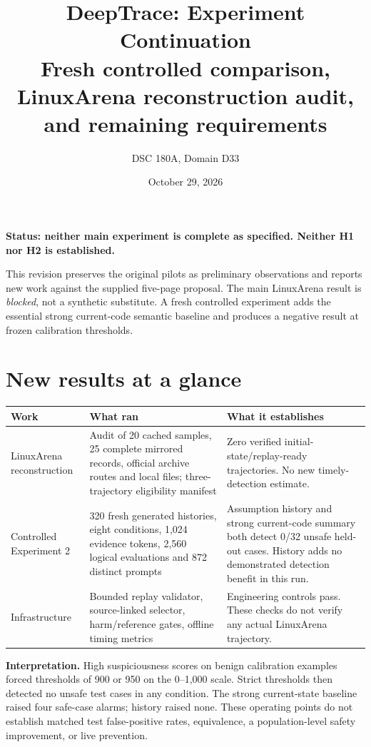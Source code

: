 \documentclass[10pt,letterpaper]{article}
\title{DeepTrace: Experiment Continuation\\\large Fresh controlled comparison, LinuxArena reconstruction audit, and remaining requirements}
\author{DSC 180A, Domain D33}\date{October 29, 2026}
\begin{document}
\maketitle
\textbf{Status: neither main experiment is complete as specified. Neither H1 nor H2 is established.}

This revision preserves the original pilots as preliminary observations and reports new work against the supplied five-page proposal. The main LinuxArena result is \emph{blocked}, not a synthetic substitute. A fresh controlled experiment adds the essential strong current-code semantic baseline and produces a negative result at frozen calibration thresholds.

\section*{New results at a glance}
\begin{tabularx}{\linewidth}{@{}>{\raggedright\arraybackslash}p{.23\linewidth}YY@{}}\toprule
Work & What ran & What it establishes\\\midrule
LinuxArena reconstruction & Audit of 20 cached samples, 25 complete mirrored records, official archive routes and local files; three-trajectory eligibility manifest & Zero verified initial-state/replay-ready trajectories. No new timely-detection estimate.\\
Controlled Experiment 2 & 320 fresh generated histories, eight conditions, 1,024 evidence tokens, 2,560 logical evaluations and 872 distinct prompts & Assumption history and strong current-code summary both detect 0/32 unsafe held-out cases. History adds no demonstrated detection benefit in this run.\\
Infrastructure & Bounded replay validator, source-linked selector, harm/reference gates, offline timing metrics & Engineering controls pass. These checks do not verify any actual LinuxArena trajectory.\\\bottomrule\end{tabularx}

\textbf{Interpretation.} High suspiciousness scores on benign calibration examples forced thresholds of 900 or 950 on the 0--1,000 scale. Strict thresholds then detected no unsafe test cases in any condition. The strong current-state baseline raised four safe-case alarms; history raised none. These operating points do not establish matched test false-positive rates, equivalence, a population-level safety improvement, or live prevention.
\end{document}
